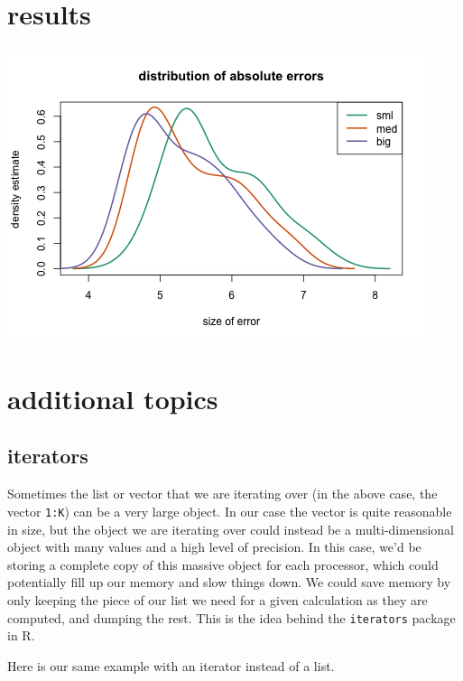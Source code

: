 \documentclass[]{article}
\begin{document}
\section{results}\label{results}

\includegraphics{../fig/errerrs.png}

\section{additional topics}\label{additional-topics}

\subsection{iterators}\label{iterators}

Sometimes the list or vector that we are iterating over (in the above
case, the vector \texttt{1:K}) can be a very large object. In our case
the vector is quite reasonable in size, but the object we are iterating
over could instead be a multi-dimensional object with many values and a
high level of precision. In this case, we'd be storing a complete copy
of this massive object for each processor, which could potentially fill
up our memory and slow things down. We could save memory by only keeping
the piece of our list we need for a given calculation as they are
computed, and dumping the rest. This is the idea behind the
\texttt{iterators} package in R.

Here is our same example with an iterator instead of a list.
\end{document}
